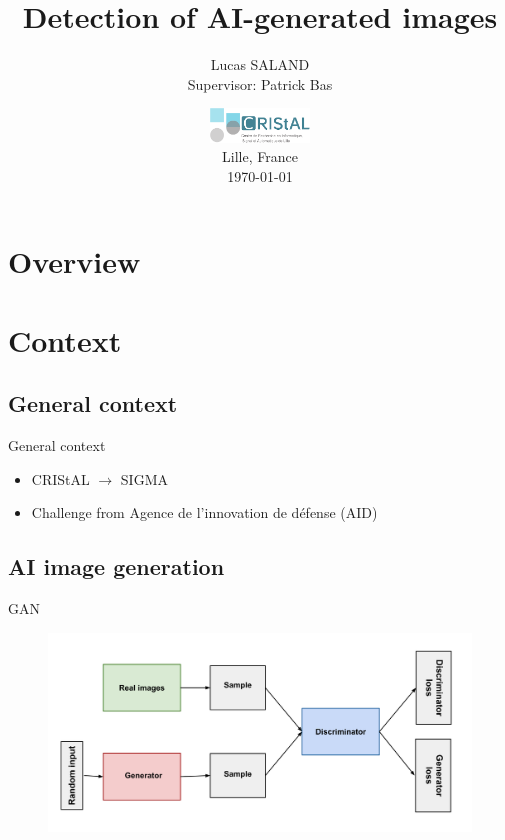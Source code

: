 \documentclass[11pt,compress]{beamer} %
\begin{document}
\title[]{Detection of AI-generated images}
\author{Lucas SALAND\\ Supervisor: Patrick Bas}
\date[\today]{\includegraphics[keepaspectratio,width=0.2\textwidth]{img/cristal.png} \medskip \\ Lille, France \medskip \\ \today}

\frame{\titlepage}

\section*{Overview}
\begin{frame}
  \tableofcontents
\end{frame}

\section{Context}
\subsection{General context}
\begin{frame}{General context}
  \begin{itemize}
    \item CRIStAL $\rightarrow$ SIGMA
    \item Challenge from Agence de l'innovation de défense (AID)
  \end{itemize}
\end{frame}
\subsection{AI image generation}
\begin{frame}{GAN}
  \begin{figure}
    \includegraphics[width=\textwidth]{img/GAN.png}
  \end{figure}
\end{frame}
\end{document}
